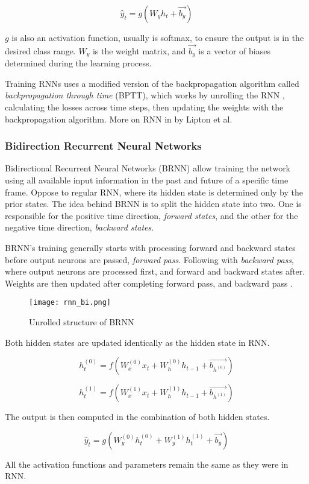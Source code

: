 \begin{equation}
    {\hat{y}_t = g(W_{y}h_t + \vec{b_y})}
\end{equation}

$g$ is also an activation function, usually is softmax, to ensure the output is in the desired class range. $W_y$ is the weight matrix, and $\vec{b_y}$ is a vector of biases determined during the learning process.

Training RNNs uses a modified version of the backpropagation algorithm called \textit{backpropagation through time} (BPTT), which works by unrolling the RNN \cite{Goodfellow-et-al-2016}, calculating the losses across time steps, then updating the weights with the backpropagation algorithm. More on RNN in \cite{lipton2015critical} by Lipton et al.


\subsubsection{Bidirection Recurrent Neural Networks}


Bidirectional Recurrent Neural Networks (BRNN) allow training the network using all available input information in the past and future of a specific time frame. Oppose to regular RNN, where its hidden state is determined only by the prior states. The idea behind BRNN is to split the hidden state into two. One is responsible for the positive time direction, \textit{forward states}, and the other for the negative time direction, \textit{backward states}.

BRNN’s training generally starts with processing forward and backward states before output neurons are passed, \textit{forward pass}. Following with \textit{backward pass}, where output neurons are processed first, and forward and backward states after. Weights are then updated after completing forward pass, and backward pass \cite{schusterbdrnn}.

\begin{figure}[h]
    \centering
    \texttt{[image: rnn\_bi.png]}
    \caption{Unrolled structure of BRNN \cite{matous}}
    \label{fig:brnn}
\end{figure}


Both hidden states are updated identically as the hidden state in RNN.

\begin{equation}
    {h_t^{(0)} = f(W_{x}^{(0)}x_t + W_{h}^{(0)}h_{t-1}+\vec{b_{h^{(0)}}})}
\end{equation}

\begin{equation}
    {h_t^{(1)} = f(W_{x}^{(1)}x_t + W_{h}^{(1)}h_{t-1}+\vec{b_{h^{(1)}}})}
\end{equation}

The output is then computed in the combination of both hidden states.

\begin{equation}
    {\hat{y}_t = g(W_{y}^{(0)}h_t^{(0)} + W_{y}^{(1)}h_t^{(1)} + \vec{b_y})}
\end{equation}

All the activation functions and parameters remain the same as they were in RNN. 
